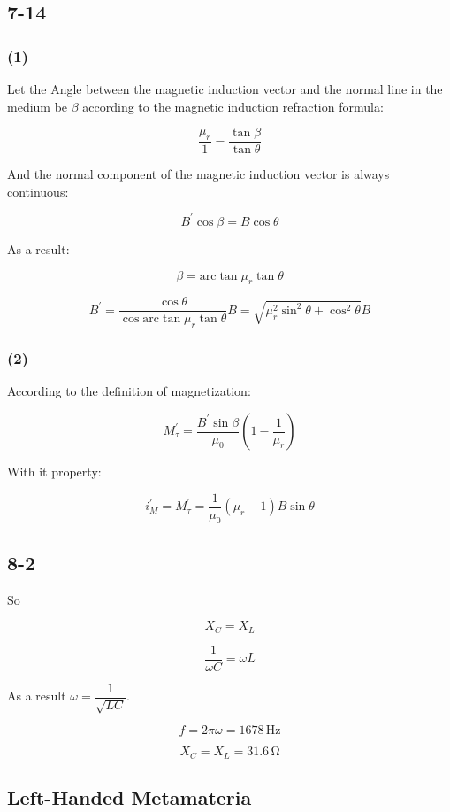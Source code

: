 \documentclass[a4paper,11pt]{amsart}
\theoremstyle{definition}
\begin{document}
	\subsection*{7-14}
	
	\subsubsection*{(1)}
	
	Let the Angle between the magnetic induction vector and the normal line in the medium be $\beta$ according to the magnetic induction refraction formula:
	
	$$
	\frac{\mu _r}{1}=\frac{\tan \beta}{\tan \theta}
	$$
	
	And the normal component of the magnetic induction vector is always continuous:
	
	$$
	B^{\prime}\cos \beta =B\cos \theta 
	$$
	
	As a result:
	
	$$
	\beta =\mathrm{arc}\tan \mu _r\tan \theta 
	$$
	
	$$
	B^{\prime}=\frac{\cos \theta}{\cos  \mathrm{arc}\tan \mu _r\tan \theta}B=\sqrt{\mu _{r}^{2}\sin ^2\theta +\cos ^2\theta}B
	$$
	
	\subsubsection*{(2)}
	
	According to the definition of magnetization:
	
	$$
	M_{\tau}^{\prime}=\frac{B^{\prime}\sin \beta}{\mu _0}\left( 1-\frac{1}{\mu _r} \right) 
	$$
	
	With it property:
	
	$$
	i_{M}^{\prime}=M_{\tau}^{\prime}=\frac{1}{\mu _0}\left( \mu _r-1 \right) B\sin \theta 
	$$
	
	\subsection*{8-2}
	
	So
	
	$$
	X_C=X_L
	$$
	
	$$
	\dfrac{1}{\omega C}=\omega L
	$$
	
	As a result $\omega=\dfrac{1}{\sqrt{LC}}.$
	
	$$
	f=2\pi\omega=1678\,\mathrm{Hz}
	$$
	
	$$
	X_C=X_L=31.6\,\mathrm{\Omega}
	$$
	
	\subsection*{Left-Handed Metamateria}
	
\end{document}
